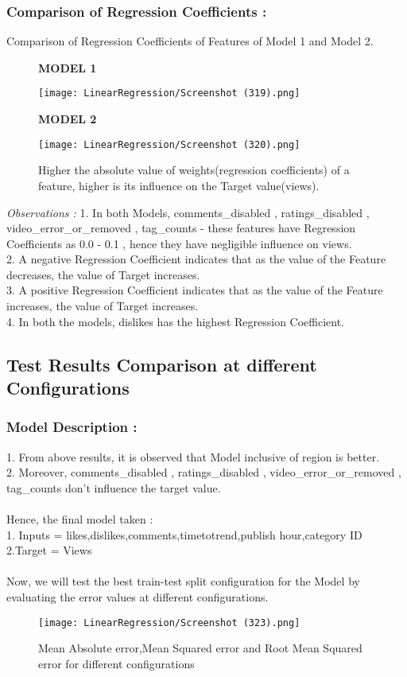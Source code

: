 \documentclass[runningheads]{llncs}
\begin{document}
\newpage
\subsubsection{Comparison of Regression Coefficients : }
Comparison of Regression Coefficients of Features of Model 1 and Model 2.
\begin{figure}[H]
\centering
\begin{minipage}{.5\textwidth}
  \centering
   \textbf{MODEL 1}\par\medskip
  \texttt{[image: LinearRegression/Screenshot (319).png]}
\end{minipage}%
\begin{minipage}{.5\textwidth}
  \centering
     \textbf{MODEL 2}\par\medskip
  \texttt{[image: LinearRegression/Screenshot (320).png]}
\end{minipage}
\caption{Higher the absolute value of weights(regression coefficients) of a feature, higher is its influence on the Target value(views).}
\end{figure}
\textit{Observations : } 
1. In both Models,  comments\_disabled , ratings\_disabled , video\_error\_or\_removed , tag\_counts - these features have Regression Coefficients as 0.0 - 0.1 , hence they have negligible influence on views. \\
2. A negative Regression Coefficient indicates that as the value of the Feature decreases, the value of Target increases.\\
3. A positive Regression Coefficient indicates that as the value of the Feature increases, the value of Target increases. \\
4. In both the models, dislikes has the highest Regression Coefficient.

\newpage
\subsection{Test Results Comparison at different Configurations}
\subsubsection{Model Description : }
1. From above results, it is observed that Model inclusive of region is better. \\
2. Moreover, comments\_disabled , ratings\_disabled , video\_error\_or\_removed , tag\_counts don't influence the target value. \\ \\
Hence, the final model taken : \\
1. Inputs = likes,dislikes,comments,timetotrend,publish hour,category ID \\
2.Target = Views \\ \\ 
Now, we will test the best train-test split configuration for the Model by evaluating the error values at different configurations.
\begin{figure}[H]
\centering
\texttt{[image: LinearRegression/Screenshot (323).png]}
\caption{Mean Absolute error,Mean Squared error  and  Root Mean Squared error for different configurations} 
\end{figure}
\end{document}
